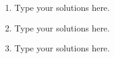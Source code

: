 \begin{answer}{
\begin{enumerate}
		\item Type your solutions here.
	
		\item Type your solutions here.
	
		\item Type your solutions here.
	\end{enumerate}
}
\end{answer}